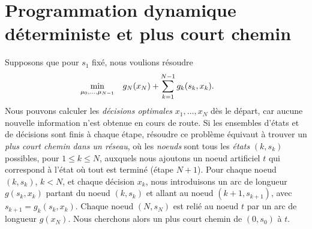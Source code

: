 \section{Programmation dynamique déterministe et plus court chemin}

Supposons que pour $s_1$ fixé, nous voulions résoudre
\begin {eqnarray*}
  \hspace{-20pt}  
  \min_{\mu_0,\dots,\mu_{N-1}}   
  && g_N(x_N) + \sum_{k=1}^{N-1} g_k(s_k, x_k).
\end {eqnarray*}
Nous pouvons calculer les \emph{décisions optimales} $x_1,\dots,x_N$
dès le départ, car aucune nouvelle information n'est obtenue en cours de route.
Si les ensembles d'états et de décisions sont finis à chaque étape,
résoudre ce problème équivaut à trouver un  \emph{plus court chemin dans un réseau}, 
où les \emph{noeuds} sont tous les \emph{états}
$(k,s_k)$ possibles, pour $1\le k\le N$, auxquels nous ajoutons un noeud artificiel $t$ qui correspond à l'état où tout est terminé (étape $N+1$).
Pour chaque noeud $(k,s_k)$, $k<N$, et chaque décision $x_k$,
nous introduisons un arc de longueur $g(s_k,x_k)$ partant du noeud $(k,s_k)$ et
allant au noeud $(k+1, s_{k+1})$, avec $s_{k+1} = g_k(s_k,x_k)$.
Chaque noeud $(N,s_N)$ est relié au noeud $t$ par un arc de longueur $g(x_N)$. 
Nous cherchons alors un plus court chemin de $(0,s_0)$ à $t$.
\begin{center}
\end{center}

